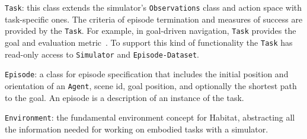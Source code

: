 \begin{compactitem}[\hspace{1pt}--]
    

    \item \texttt{Task}: this class extends the simulator's \texttt{Observations} class and action space with task-specific ones. The criteria of episode termination and measures of success are provided by the \texttt{Task}. For example, 
    in goal-driven navigation, \texttt{Task} provides 
    the goal and evaluation metric~\cite{Anderson2018-Evaluation}. 
    To support this kind of functionality the \texttt{Task} has read-only access to \texttt{Simulator} and \texttt{Episode-Dataset}.

    \item \texttt{Episode}: a class for episode specification that includes the initial position and orientation of an \texttt{Agent}, scene id,  goal position, and optionally the shortest path to the goal. An episode is a description of an instance of the task. %
    
    
    \item \texttt{Environment}: the fundamental environment concept for Habitat, abstracting all the information needed for working on embodied tasks with a simulator.  %

\end{compactitem}

